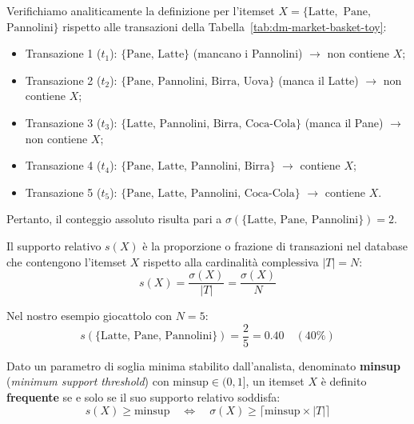 Verifichiamo analiticamente la definizione per l'itemset $X = \{\text{Latte},$ $\text{Pane},$ $\text{Pannolini}\}$ rispetto alle transazioni della Tabella~\ref{tab:dm-market-basket-toy}:
\begin{itemize}[noitemsep]
    \item Transazione 1 ($t_1$): $\{\text{Pane, Latte}\}$ (mancano i Pannolini) $\rightarrow$ non contiene $X$;
    \item Transazione 2 ($t_2$): $\{\text{Pane, Pannolini, Birra, Uova}\}$ (manca il Latte) $\rightarrow$ non contiene $X$;
    \item Transazione 3 ($t_3$): $\{\text{Latte, Pannolini, Birra, Coca-Cola}\}$ (manca il Pane) $\rightarrow$ non contiene $X$;
    \item Transazione 4 ($t_4$): $\{\text{Pane, Latte, Pannolini, Birra}\}$ $\rightarrow$ contiene $X$;
    \item Transazione 5 ($t_5$): $\{\text{Pane, Latte, Pannolini, Coca-Cola}\}$ $\rightarrow$ contiene $X$.
\end{itemize}
Pertanto, il conteggio assoluto risulta pari a $\sigma(\{\text{Latte, Pane, Pannolini}\}) = 2$.

\begin{definition}
Il supporto relativo $s(X)$ è la proporzione o frazione di transazioni nel database che contengono l'itemset $X$ rispetto alla cardinalità complessiva $|T| = N$:
\begin{equation}
\label{eq:dm-relative-support}
s(X) = \frac{\sigma(X)}{|T|} = \frac{\sigma(X)}{N}
\end{equation}
\end{definition}

Nel nostro esempio giocattolo con $N = 5$:
\begin{equation}
s(\{\text{Latte, Pane, Pannolini}\}) = \frac{2}{5} = 0.40 \quad (40\%)
\end{equation}

\begin{definition}
Dato un parametro di soglia minima stabilito dall'analista, denominato \textbf{minsup} (\textit{minimum support threshold}) con $\mathrm{minsup} \in (0, 1]$, un itemset $X$ è definito \textbf{frequente} se e solo se il suo supporto relativo soddisfa:
\begin{equation}
\label{eq:dm-frequent-itemset-def}
s(X) \ge \mathrm{minsup} \quad \Longleftrightarrow \quad \sigma(X) \ge \lceil \mathrm{minsup} \times |T| \rceil
\end{equation}
\end{definition}

